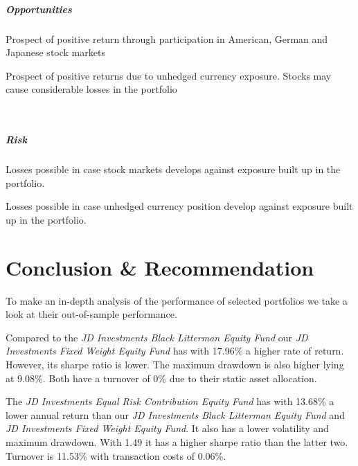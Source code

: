 \documentclass[11pt, parskip=full, DIV=14]{scrreprt}
\begin{document}
\begin{minipage}[t]{0.49\textwidth}
  \paragraph{Opportunities}
  \begin{sit}
  \item Prospect of positive return through participation in American, German and Japanese stock markets
  \item Prospect of positive returns due to unhedged currency exposure. Stocks may cause considerable losses in the portfolio
  \end{sit}
\end{minipage}
~~
\begin{minipage}[t]{0.49\textwidth}
  \paragraph{Risk}
  \begin{sit}
  \item Losses possible in case stock markets develops against exposure built up in the portfolio.
  \item Losses possible in case unhedged currency position develop against exposure built up in the portfolio.
  \end{sit}
\end{minipage}

\chapter{Conclusion \& Recommendation}
To make an in-depth analysis of the performance of selected portfolios we take a look at their out-of-sample performance.

Compared to the \textit{JD Investments Black Litterman Equity Fund} our \textit{JD Investments Fixed Weight Equity Fund} has with 17.96\% a higher rate of return. However, its sharpe ratio is lower. The maximum drawdown is also higher lying at 9.08\%. Both have a turnover of 0\% due to their static asset allocation.

The \textit{JD Investments Equal Risk Contribution Equity Fund} has with 13.68\% a lower annual return than our \textit{JD Investments Black Litterman Equity Fund} and \textit{JD Investments Fixed Weight Equity Fund}. It also has a lower volatility and maximum drawdown. With 1.49 it has a higher sharpe ratio than the latter two. Turnover is 11.53\% with transaction costs of 0.06\%. 
\end{document}
